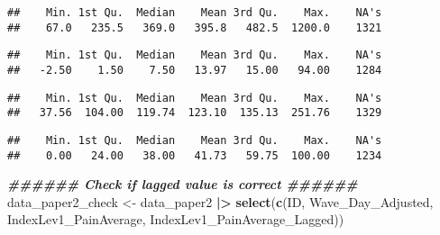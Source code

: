 \documentclass[
  12pt,
]{article}
\newenvironment{Shaded}{\begin{snugshade}}{\end{snugshade}}
\newcommand{\CommentTok}[1]{\textcolor[rgb]{0.56,0.35,0.01}{\textit{#1}}}
\newcommand{\DocumentationTok}[1]{\textcolor[rgb]{0.56,0.35,0.01}{\textbf{\textit{#1}}}}
\newcommand{\FunctionTok}[1]{\textcolor[rgb]{0.13,0.29,0.53}{\textbf{#1}}}
\newcommand{\NormalTok}[1]{#1}
\newcommand{\OtherTok}[1]{\textcolor[rgb]{0.56,0.35,0.01}{#1}}
\newcommand{\SpecialCharTok}[1]{\textcolor[rgb]{0.81,0.36,0.00}{\textbf{#1}}}
\begin{document}
\begin{verbatim}
##    Min. 1st Qu.  Median    Mean 3rd Qu.    Max.    NA's 
##    67.0   235.5   369.0   395.8   482.5  1200.0    1321
\end{verbatim}

\begin{Shaded}
\end{Shaded}

\begin{verbatim}
##    Min. 1st Qu.  Median    Mean 3rd Qu.    Max.    NA's 
##   -2.50    1.50    7.50   13.97   15.00   94.00    1284
\end{verbatim}

\begin{Shaded}
\end{Shaded}

\begin{verbatim}
##    Min. 1st Qu.  Median    Mean 3rd Qu.    Max.    NA's 
##   37.56  104.00  119.74  123.10  135.13  251.76    1329
\end{verbatim}

\begin{Shaded}
\end{Shaded}

\begin{verbatim}
##    Min. 1st Qu.  Median    Mean 3rd Qu.    Max.    NA's 
##    0.00   24.00   38.00   41.73   59.75  100.00    1234
\end{verbatim}

\begin{Shaded}
\begin{Highlighting}[]
\DocumentationTok{\#\#\#\#\#\# Check if lagged value is correct \#\#\#\#\#\#}
\NormalTok{data\_paper2\_check }\OtherTok{\textless{}{-}}\NormalTok{ data\_paper2 }\SpecialCharTok{|\textgreater{}}
  \FunctionTok{select}\NormalTok{(}\FunctionTok{c}\NormalTok{(ID, Wave\_Day\_Adjusted, IndexLev1\_PainAverage, IndexLev1\_PainAverage\_Lagged))}
\end{Highlighting}
\end{Shaded}
\end{document}
